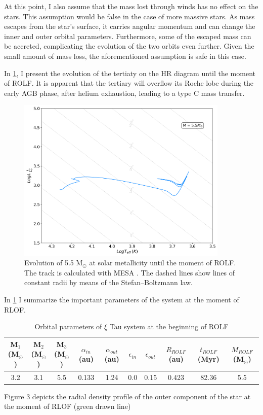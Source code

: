 At this point, I also assume that the mass lost through winds has no effect on the stars. This assumption would be false in the case of more massive stars. As mass escapes from the star's surface, it carries angular momentum and can change the inner and outer orbital parameters. Furthermore, some of the escaped mass can be accreted, complicating the evolution of the two orbits even further. Given the small amount of mass loss, the aforementioned assumption is safe in this case.

In \cref{fig:HR_ROLF}, I present the evolution of the tertiaty on the HR diagram until the moment of ROLF. It is apparent that the tertiary will overflow its Roche lobe during the early AGB phase, after helium exhaustion, leading to a type C mass transfer.

\begin{figure}[H]
    \centering
    \includegraphics[width=0.9\textwidth]{Thesis/graphs/HR_1-1ROLF.pdf}
    \caption{Evolution of 5.5 M$_{\odot}$ at solar metallicity until the moment of ROLF. The track is calculated with MESA \citep{paxton2010modules,paxton2013modules,paxton2015modules,paxton2019modules}. The dashed lines show lines of constant radii by means of the Stefan–Boltzmann law.}
    \label{fig:HR_ROLF}
\end{figure}

In \cref{tab:system_orbit_param_ROLF} I summarize the important parameters of the system at the moment of RLOF.

\begin{table}[H]
    \begin{adjustbox}{width=1\textwidth}
    \small
    \centering
    \begin{tabular}{| c c c c c c c c c c|}
       M$_1$ (M$_{\odot}$) & 
       M$_2$ (M$_{\odot}$) &
       M$_3$ (M$_{\odot}$) & $\alpha_{in}$ (au) &
       $\alpha_{out}$ (au) &
       $\epsilon_{in}$ &
       $\epsilon_{out}$ &
       $R_{ROLF}$ (au) &
       $t_{ROLF}$ (Myr) &
       $M_{ROLF}$  (M$_{\odot}$) \\
       \hline
       3.2 & 3.1 & 5.5 & 0.133 & 1.24 & 0.0 & 0.15 & 0.423 & 82.36 & 5.5
    \end{tabular}
    \end{adjustbox}
    \caption{ Orbital parameters of $\xi$ Tau system at the beginning of ROLF}
    \label{tab:system_orbit_param_ROLF}
\end{table}


Figure 3 depicts the radial density profile of the outer component of the star at the moment of RLOF (green drawn line)


